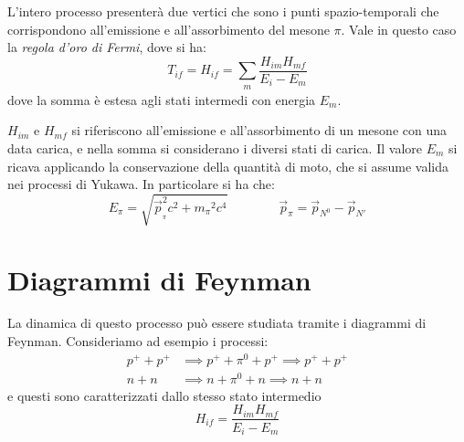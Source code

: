 L'intero processo presenterà due vertici che sono i punti spazio-temporali che
corrispondono all'emissione e all'assorbimento del mesone $\pi$. Vale in questo
caso la \textit{regola d'oro di Fermi}, dove si ha:
\begin{equation*}
T_{if} = H_{if} = \sum_{\substack{m}} \dfrac{H_{im}H_{mf}}{E_i - E_m}
\end{equation*}
dove la somma è estesa agli stati intermedi con energia $E_m$. 

$H_{im}$ e $H_{mf}$ si riferiscono all'emissione e all'assorbimento di un mesone
con una data carica, e nella somma si considerano i diversi stati di carica.
Il valore $E_m$ si ricava applicando la conservazione della quantità di moto,
che si assume valida nei processi di Yukawa. In particolare si ha che:
\begin{equation*}
E_{\pi} = \sqrt{\vec{p}_{_{\pi}}^2 c^2 + {m_{\pi}}^2 c^4} \qquad \qquad 
\vec{p}_{\pi} = \vec{p}_{N^0} - \vec{p}_{N'}
\end{equation*}

\section{Diagrammi di Feynman}
La dinamica di questo processo può essere studiata tramite i diagrammi di 
Feynman. Consideriamo ad esempio i processi:
\begin{align*}
p^+ + p^+ &\implies p^+ + \pi^0 + p^+ \implies p^+ + p^+ \\
n + n &\implies n + \pi^0 + n \implies n + n
\end{align*}
e questi sono caratterizzati dallo stesso stato intermedio
\begin{equation*}
H_{if} = \dfrac{H_{im}H_{mf}}{E_i - E_m}
\end{equation*}

